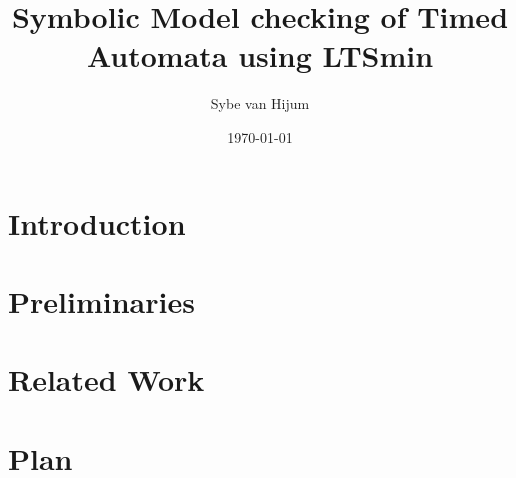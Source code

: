\documentclass[11pt]{article}
\begin{document}
\newtheorem{mydef}{Definition}
\title{Symbolic Model checking of Timed Automata using LTSmin}
\author{Sybe van Hijum}
\date{\today}
\maketitle

\tableofcontents

\section{Introduction}


\section{Preliminaries}



\section{Related Work}


\section{Plan}



{}

\end{document}
